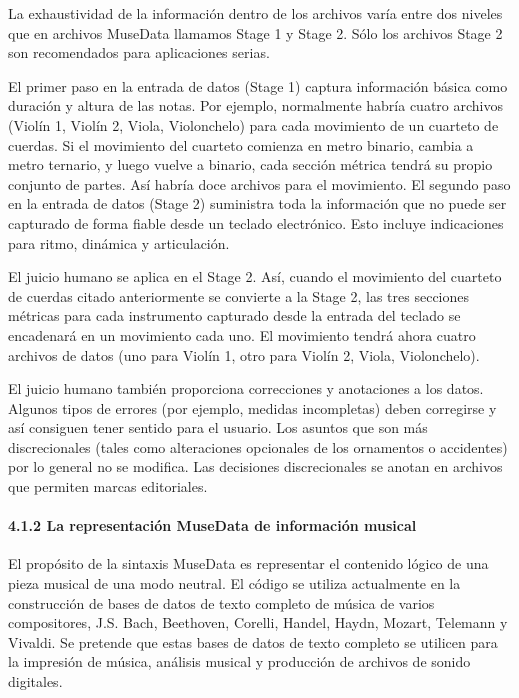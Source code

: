 \documentclass[]{article}
\let\oldparagraph\paragraph
\renewcommand{\paragraph}[1]{\oldparagraph{#1}\mbox{}}
\begin{document}
La exhaustividad de la información dentro de los archivos varía entre
dos niveles que en archivos MuseData llamamos Stage 1 y Stage 2. Sólo
los archivos Stage 2 son recomendados para aplicaciones serias.

El primer paso en la entrada de datos (Stage 1) captura información
básica como duración y altura de las notas. Por ejemplo, normalmente
habría cuatro archivos (Violín 1, Violín 2, Viola, Violonchelo) para
cada movimiento de un cuarteto de cuerdas. Si el movimiento del cuarteto
comienza en metro binario, cambia a metro ternario, y luego vuelve a
binario, cada sección métrica tendrá su propio conjunto de partes. Así
habría doce archivos para el movimiento. El segundo paso en la entrada
de datos (Stage 2) suministra toda la información que no puede ser
capturado de forma fiable desde un teclado electrónico. Esto incluye
indicaciones para ritmo, dinámica y articulación.

El juicio humano se aplica en el Stage 2. Así, cuando el movimiento del
cuarteto de cuerdas citado anteriormente se convierte a la Stage 2, las
tres secciones métricas para cada instrumento capturado desde la entrada
del teclado se encadenará en un movimiento cada uno. El movimiento
tendrá ahora cuatro archivos de datos (uno para Violín 1, otro para
Violín 2, Viola, Violonchelo).

El juicio humano también proporciona correcciones y anotaciones a los
datos. Algunos tipos de errores (por ejemplo, medidas incompletas) deben
corregirse y así consiguen tener sentido para el usuario. Los asuntos
que son más discrecionales (tales como alteraciones opcionales de los
ornamentos o accidentes) por lo general no se modifica. Las decisiones
discrecionales se anotan en archivos que permiten marcas editoriales.

\hypertarget{la-representaciuxf3n-musedata-de-informaciuxf3n-musical}{%
\paragraph{4.1.2 La representación MuseData de información
musical}\label{la-representaciuxf3n-musedata-de-informaciuxf3n-musical}}

El propósito de la sintaxis MuseData es representar el contenido lógico
de una pieza musical de una modo neutral. El código se utiliza
actualmente en la construcción de bases de datos de texto completo de
música de varios compositores, J.S. Bach, Beethoven, Corelli, Handel,
Haydn, Mozart, Telemann y Vivaldi. Se pretende que estas bases de datos
de texto completo se utilicen para la impresión de música, análisis
musical y producción de archivos de sonido digitales.
\end{document}
